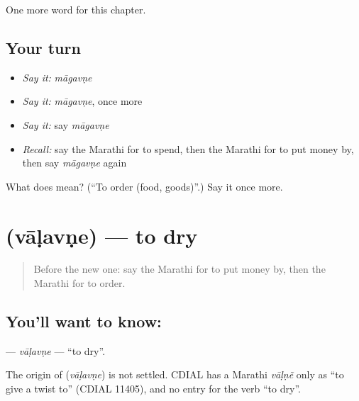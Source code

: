 \begin{grammarlens}[title={What you've built}]
One more word for this chapter.
\end{grammarlens}

\subsection*{Your turn}
\begin{itemize}
\raggedright
  \item \emph{Say it:} \emph{māgavṇe}
  \item \emph{Say it:} \emph{māgavṇe}, once more
  \item \emph{Say it:} say \emph{māgavṇe}
  \item \emph{Recall:} say the Marathi for to spend, then the Marathi for to put money by, then say \emph{māgavṇe} again
\end{itemize}

\begin{tcolorbox}[breakable,colback=teal!4,colframe=teal!35!black,title={Before you move on}]
What does  mean? (\textquotedblleft{}To order (food, goods)\textquotedblright{}.) Say it once more.
\end{tcolorbox}
\section[\texorpdfstring{\mr{वाळवणे} (vāḷavṇe)}{वाळवणे (vāḷavṇe)}]{ (vāḷavṇe) — to dry}

\label{lesson:MR-C193-valavne}



\begin{quote}
Before the new one: say the Marathi for to put money by, then the Marathi for to order.
\end{quote}

\subsection*{You'll want to know: }
\textbf{} — \emph{vāḷavṇe} — \textquotedblleft{}to dry\textquotedblright{}.

\begin{cousinweb}
The origin of \textbf{} (\emph{vāḷavṇe}) is not settled. CDIAL has a Marathi \emph{vāḷṇẽ} only as \textquotedblleft{}to give a twist to\textquotedblright{} (CDIAL 11405), and no entry for the verb \textquotedblleft{}to dry\textquotedblright{}.
\end{cousinweb}

